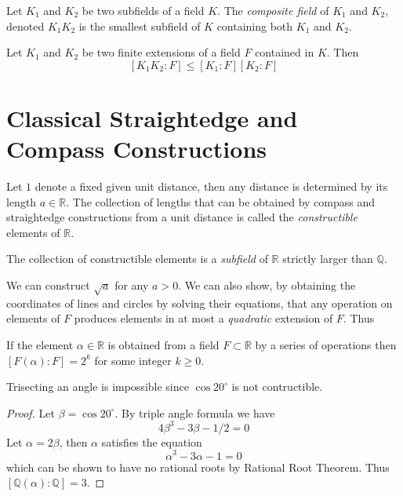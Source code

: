 \documentclass[a4paper]{article}
\begin{document}
\begin{defi}
  Let $K_1$ and $K_2$ be two subfields of a field $K$. The \emph{composite field} of $K_1$ and $K_2$, denoted $K_1K_2$ is the smallest subfield of $K$ containing both $K_1$ and $K_2$.
\end{defi}

\begin{prop}\label{prop:composite}
  Let $K_1$ and $K_2$ be two finite extensions of a field $F$ contained in $K$. Then
  \[
    [K_1K_2:F] \leq [K_1:F][K_2:F]
  \]
\end{prop}

\section{Classical Straightedge and Compass Constructions}

Let $1$ denote a fixed given unit distance, then any distance is determined by its length $a\in \mathbb{R}$. The collection of lengths that can be obtained by compass and straightedge constructions from a unit distance is called the \emph{constructible} elements of $\mathbb{R}$.

\begin{prop}
  The collection of constructible elements is a \emph{subfield} of $\mathbb{R}$ strictly larger than $\mathbb{Q}$.
\end{prop}

We can construct $\sqrt a$ for any $a > 0$. We can also show, by obtaining the coordinates of lines and circles by solving their equations, that any operation on elements of $F$ produces elements in at most a \emph{quadratic} extension of $F$. Thus

\begin{prop}
  If the element $\alpha\in\mathbb{R}$ is obtained from a field $F \subset \mathbb{R}$ by a series of operations then $[F(\alpha):F]=2^k$ for some integer $k \geq 0$.
\end{prop}

\begin{prop}
  Trisecting an angle is impossible since $\cos 20^{\circ}$ is not contructible.
\end{prop}

\begin{proof}
  Let $\beta=\cos20^\circ$. By triple angle formula we have
  \[
    4\beta^3 -3\beta - 1/2 = 0
  \]
  Let $\alpha=2\beta$, then $\alpha$ satisfies the equation
  \[
    \alpha^3-3\alpha-1=0
  \]
  which can be shown to have no rational roots by Rational Root Theorem. Thus $[\mathbb{Q}(\alpha):\mathbb{Q}]=3$.
\end{proof}
\end{document}
